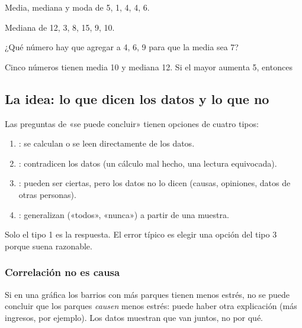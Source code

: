 \taller
{}
\begin{ejercicios}
\item Media, mediana y moda de 5, 1, 4, 4, 6. 
\item Mediana de 12, 3, 8, 15, 9, 10. 
\item ¿Qué número hay que agregar a 4, 6, 9 para que la media sea 7? 
\end{ejercicios}
\begin{ejercicios}
\item Cinco números tienen media 10 y mediana 12. Si el mayor aumenta 5, entonces
\end{ejercicios}

\bitacora


\subsection{La idea: lo que dicen los datos y lo que no}
Las preguntas de «se puede concluir» tienen opciones de cuatro tipos:
\begin{enumerate}
  \item {}: se calculan o se leen directamente de los datos.
  \item {}: contradicen los datos (un cálculo mal hecho, una lectura equivocada).
  \item {}: pueden ser ciertas, pero los datos no lo dicen (causas, opiniones, datos de otras personas).
  \item {}: generalizan («todos», «nunca») a partir de una muestra.
\end{enumerate}
Solo el tipo 1 es la respuesta. El error típico es elegir una opción del tipo 3 porque suena razonable.

\subsubsection{Correlación no es causa}
Si en una gráfica los barrios con más parques tienen menos estrés, no se puede concluir que los parques \emph{causen}
menos estrés: puede haber otra explicación (más ingresos, por ejemplo). Los datos muestran que van juntos, no por qué.

